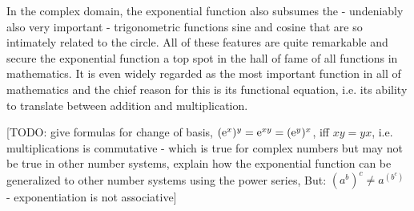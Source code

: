 \medskip
In the complex domain, the exponential function also subsumes the - undeniably also very important - trigonometric functions sine and cosine that are so intimately related to the circle. All of these features are quite remarkable and secure the exponential function a top spot in the hall of fame of all functions in mathematics. It is even widely regarded as the most important function in all of mathematics and the chief reason for this is its functional equation, i.e. its ability to translate between addition and multiplication.




[TODO: give formulas for change of basis, $(\operatorname{\mathrm{e}}^x)^y = \operatorname{\mathrm{e}}^{x y} = (\operatorname{\mathrm{e}}^y)^x$, iff $xy = yx$, i.e. multiplications is commutative - which is true for complex numbers but may not be true in other number systems, explain how the exponential function can be generalized to other number systems using the power series, But: $(a^b)^c \neq a^{(b^c)}$ - exponentiation is not associative]








